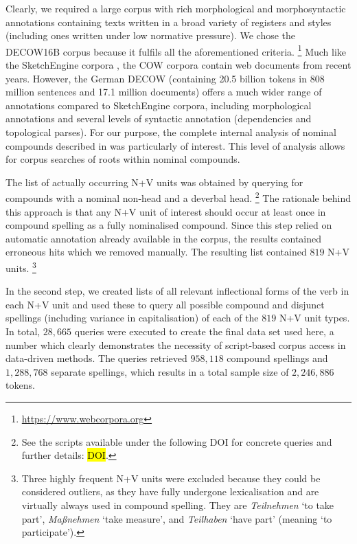 \documentclass[biblatex, charis, linguex]{glossa}\usepackage{knitr}
\begin{document}
Clearly, we required a large corpus with rich morphological and morphosyntactic annotations containing texts written in a broad variety of registers and styles (including ones written under low normative pressure).
We chose the DECOW16B corpus \parencite{SchaeferBildhauer2012a} because it fulfils all the aforementioned criteria.%
\footnote{\url{https://www.webcorpora.org}}
Much like the SketchEngine corpora \parencite{KilgarriffEa2014}, the COW corpora contain web documents from recent years.
However, the German DECOW (containing 20.5 billion tokens in 808 million sentences and 17.1 million documents) offers a much wider range of annotations compared to SketchEngine corpora, including morphological annotations and several levels of syntactic annotation (dependencies and topological parses).
For our purpose, the complete internal analysis of nominal compounds described in \citet{SchaeferPankratz2018} was particularly of interest.
This level of analysis allows for corpus searches of roots within nominal compounds.

The list of actually occurring N+V units was obtained by querying for compounds with a nominal non-head and a deverbal head.%
\footnote{See the scripts available under the following DOI for concrete queries and further details: \hl{DOI}.}
The rationale behind this approach is that any N+V unit of interest should occur at least once in compound spelling as a fully nominalised compound.
Since this step relied on automatic annotation already available in the corpus, the results contained erroneous hits which we removed manually.
The resulting list contained $819$ N+V units.%
\footnote{Three highly frequent N+V units were excluded because they could be considered outliers, as they have fully undergone lexicalisation and are virtually always used in compound spelling.
They are \textit{Teilnehmen} `to take part', \textit{Maßnehmen} `take measure', and \textit{Teilhaben} `have part' (meaning `to participate').}

In the second step, we created lists of all relevant inflectional forms of the verb in each N+V unit and used these to query all possible compound and disjunct spellings (including variance in capitalisation) of each of the $819$ N+V unit types.
In total, $28,665$ queries were executed to create the final data set used here, a number which clearly demonstrates the necessity of script-based corpus access in data-driven methods.
The queries retrieved $958,118$ compound spellings and $1,288,768$ separate spellings, which results in a total sample size of $2,246,886$ tokens.
\end{document}
